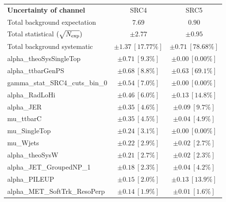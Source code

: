 
\begin{table}
\begin{center}
\setlength{\tabcolsep}{0.0pc}
\begin{tabular*}{\textwidth}{@{\extracolsep{\fill}}lcc}
\noalign{\smallskip}\hline\noalign{\smallskip}
{\bf Uncertainty of channel}                                    & SRC4            & SRC5            \\
\noalign{\smallskip}\hline\noalign{\smallskip}
Total background expectation             &  $7.69$        &  $0.90$       \\
\noalign{\smallskip}\hline\noalign{\smallskip}
Total statistical $(\sqrt{N_{\rm exp}})$              & $\pm 2.77$        & $\pm 0.95$       \\
Total background systematic               & $\pm 1.37\ [17.77\%] $        & $\pm 0.71\ [78.68\%] $             \\
\noalign{\smallskip}\hline\noalign{\smallskip}
\noalign{\smallskip}\hline\noalign{\smallskip}
alpha\_theoSysSingleTop         & $\pm 0.71\ [9.3\%] $          & $\pm 0.00\ [0.00\%] $       \\
alpha\_ttbarGenPS         & $\pm 0.68\ [8.8\%] $          & $\pm 0.63\ [69.1\%] $       \\
gamma\_stat\_SRC4\_cuts\_bin\_0         & $\pm 0.54\ [7.0\%] $          & $\pm 0.00\ [0.00\%] $       \\
alpha\_RadLoHi         & $\pm 0.46\ [6.0\%] $          & $\pm 0.13\ [14.8\%] $       \\
alpha\_JER         & $\pm 0.35\ [4.6\%] $          & $\pm 0.09\ [9.7\%] $       \\
mu\_ttbarC         & $\pm 0.35\ [4.5\%] $          & $\pm 0.04\ [4.9\%] $       \\
mu\_SingleTop         & $\pm 0.24\ [3.1\%] $          & $\pm 0.00\ [0.00\%] $       \\
mu\_Wjets         & $\pm 0.22\ [2.9\%] $          & $\pm 0.02\ [2.7\%] $       \\
alpha\_theoSysW         & $\pm 0.21\ [2.7\%] $          & $\pm 0.02\ [2.3\%] $       \\
alpha\_JET\_GroupedNP\_1         & $\pm 0.18\ [2.3\%] $          & $\pm 0.04\ [4.2\%] $       \\
alpha\_PILEUP         & $\pm 0.15\ [2.0\%] $          & $\pm 0.13\ [13.9\%] $       \\
alpha\_MET\_SoftTrk\_ResoPerp         & $\pm 0.14\ [1.9\%] $          & $\pm 0.01\ [1.6\%] $       \\

\end{tabular*}
\end{center}
\end{table}
